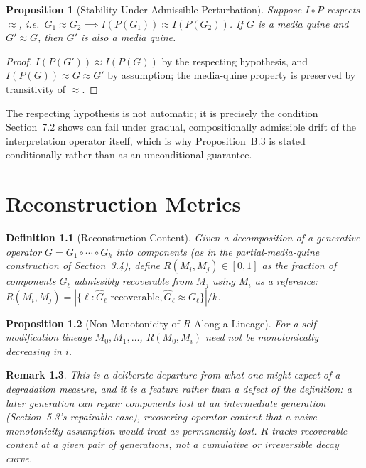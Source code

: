 \documentclass[11pt]{book}
\newtheorem{definition}{Definition}[chapter]
\newtheorem{proposition}[definition]{Proposition}
\newtheorem{remark}[definition]{Remark}
\begin{document}
\begin{proposition}[Stability Under Admissible Perturbation]
Suppose $I\circ P$ respects $\approx$, i.e.\ $G_1\approx G_2 \implies I(P(G_1))\approx I(P(G_2))$. If $G$ is a media quine and $G'\approx G$, then $G'$ is also a media quine.
\end{proposition}
\begin{proof}
$I(P(G'))\approx I(P(G))$ by the respecting hypothesis, and $I(P(G))\approx G\approx G'$ by assumption; the media-quine property is preserved by transitivity of $\approx$.
\end{proof}

The respecting hypothesis is not automatic; it is precisely the condition Section~7.2 shows can fail under gradual, compositionally admissible drift of the interpretation operator itself, which is why Proposition~B.3 is stated conditionally rather than as an unconditional guarantee.

\chapter{Reconstruction Metrics}
\label{app:metrics}

\begin{definition}[Reconstruction Content]
Given a decomposition of a generative operator $G=G_1\circ\cdots\circ G_k$ into components (as in the partial-media-quine construction of Section~3.4), define $R(M_i,M_j)\in[0,1]$ as the fraction of components $G_\ell$ admissibly recoverable from $M_j$ using $M_i$ as a reference: $R(M_i,M_j) = |\{\ell : \widehat{G}_\ell \text{ recoverable}, \widehat{G}_\ell\approx G_\ell\}| / k$.
\end{definition}

\begin{proposition}[Non-Monotonicity of $R$ Along a Lineage]
For a self-modification lineage $M_0,M_1,\dots$, $R(M_0,M_i)$ need not be monotonically decreasing in $i$.
\end{proposition}
\begin{remark}
This is a deliberate departure from what one might expect of a degradation measure, and it is a feature rather than a defect of the definition: a later generation can \emph{repair} components lost at an intermediate generation (Section~5.3's repairable case), recovering operator content that a naive monotonicity assumption would treat as permanently lost. $R$ tracks recoverable content at a given pair of generations, not a cumulative or irreversible decay curve.
\end{remark}
\end{document}
